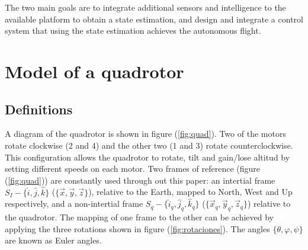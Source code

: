 \documentclass[conference]{IEEEtran}
\newcommand{\refp}[1]{(\ref{#1})}
\begin{document}

 
The two main goals are to integrate additional sensors and intelligence to the available platform to obtain a state estimation, and design and integrate a control system that using the state estimation achieves the autonomous flight.
\section{Model of a quadrotor}
\label{sec:modelo}

\subsection{Definitions}
\label{sec:modelo-defs}

A diagram of the quadrotor is shown in figure \refp{fig:quad}. Two of the motors rotate clockwise (2 and 4) and the other two (1 and 3) rotate counterclockwise. This configuration allows the quadrotor to rotate, tilt and gain/lose altitud by setting different speeds on each motor. Two frames of reference (figure \refp{fig:quad}) are constantly used through out this paper: an intertial frame $S_I - \lbrace \hat{i},\hat{j},\hat{k}\rbrace$ ($\lbrace \vec{x},\vec{y},\vec{z}\rbrace$), relative to the Earth, mapped to  North, West and Up respectively, and a non-intertial frame $S_q - \lbrace \hat{i}_q,\hat{j}_q,\hat{k}_q\rbrace$ ($\lbrace \vec{x}_q,\vec{y}_q,\vec{z}_q\rbrace$) relative to the quadrotor. The mapping of one frame to the other can be achieved by applying the three rotations shown in figure \refp{fig:rotaciones}. The angles $\lbrace \theta, \varphi, \psi\rbrace$ are known as Euler angles.
\end{document}
